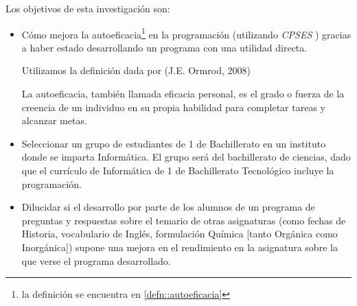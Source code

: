 \documentclass[palatino,miniheader]{apuntesURJC}
\newcommand{\CPSES}{\textit{\gls{CPSES}} \cite{CPSES}}
\begin{document}
Los objetivos de esta investigación son:
\begin{itemize}
	\item Cómo mejora la autoeficacia\footnote{la definición se encuentra en \ref{defn::autoeficacia}} en la programación (utilizando \CPSES) gracias a haber estado desarrollando un programa con una utilidad directa.
	
	\begin{defn}[Autoeficacia]
	\label{defn::autoeficacia}

	Utilizamos la definición dada por (J.E. Ormrod, 2008) \cite{autoef}

	La autoeficacia, también llamada eficacia personal, es el grado o fuerza de la creencia de un individuo en su propia habilidad para completar tareas y alcanzar metas.

	\end{defn}

	\item Seleccionar un grupo de estudiantes de 1 de Bachillerato en un instituto donde se imparta Informática.  
	El grupo será del bachillerato de ciencias, dado que el currículo de Informática de 1 de Bachillerato Tecnológico incluye la programación.
	\item Dilucidar si el desarrollo por parte de los alumnos de un programa de preguntas y respuestas sobre el temario de otras asignaturas (como fechas de Historia, vocabulario de Inglés, formulación Química [tanto Orgánica como Inorgánica]) supone una mejora en el rendimiento en la asignatura sobre la que verse el programa desarrollado.
\end{itemize}

\end{document}
